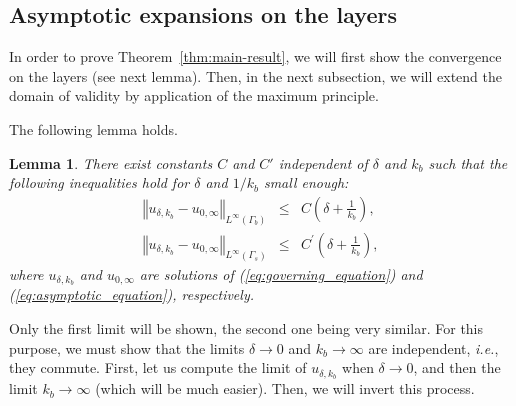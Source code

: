 \documentclass[final]{siamltex}
\numberwithin{equation}{section}
\numberwithin{figure}{section}
\numberwithin{table}{section}
\newtheorem{lem}{Lemma}
\begin{document}
\subsection{Asymptotic expansions on the layers}

In order to prove Theorem~\ref{thm:main-result}, we will first
show the convergence on the layers (see next lemma). Then, in the
next subsection, we will extend the domain of validity by
application of the maximum principle.

The following lemma holds. \begin{lem} There exist constants $C$
and $C'$ independent of $\delta$ and $k_{b}$ such that the
following inequalities hold for $\delta$ and $1/k_{b}$ small
enough:
\begin{equation}
\begin{alignedat}{2}\left\Vert u_{\delta,k_{b}}-u_{0,\infty}\right\Vert _{L^{\infty}(\Gamma_{b})} & \leq & C\left(\delta+\frac{1}{k_{b}}\right),\\
\left\Vert u_{\delta,k_{b}}-u_{0,\infty}\right\Vert
_{L^{\infty}(\Gamma_{s})} & \leq & C^\prime
\left(\delta+\frac{1}{k_{b}}\right),
\end{alignedat}
\label{eq:estimates-layer}
\end{equation}
 where $u_{\delta,k_{b}}$ and $u_{0,\infty}$ are solutions of (\ref{eq:governing_equation})
and (\ref{eq:asymptotic_equation}), respectively.\end{lem} \proof
Only the first limit will be shown, the second one being very
similar. For this purpose, we must show that the limits
$\delta\rightarrow0$ and $k_{b}\rightarrow\infty$ are independent,
\emph{i.e.}, they commute. First, let us compute the limit of
$u_{\delta,k_{b}}$ when $\delta\rightarrow0$, and then the limit
$k_{b}\rightarrow\infty$ (which will be much easier). Then, we
will invert this process.
\end{document}
